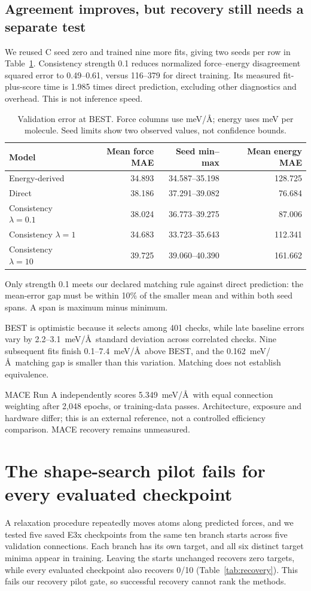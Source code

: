 \documentclass{article}
\begin{document}
\subsection{Agreement improves, but recovery still needs a separate test}
We reused C seed zero and trained nine more fits, giving two seeds per row in Table~\ref{tab:prediction}. Consistency strength 0.1 reduces normalized force--energy disagreement squared error to 0.49--0.61, versus 116--379 for direct training. Its measured fit-plus-score time is 1.985 times direct prediction, excluding other diagnostics and overhead. This is not inference speed.
\begin{table}[H]
\centering\small
\caption{Validation error at BEST. Force columns use meV/\AA; energy uses meV per molecule. Seed limits show two observed values, not confidence bounds.}\label{tab:prediction}
\begin{tabular}{lrrr}\toprule
Model & Mean force MAE & Seed min--max & Mean energy MAE\\\midrule
Energy-derived & 34.893 & 34.587--35.198 & 128.725\\
Direct & 38.186 & 37.291--39.082 & 76.684\\
Consistency $\lambda=0.1$ & 38.024 & 36.773--39.275 & 87.006\\
Consistency $\lambda=1$ & 34.683 & 33.723--35.643 & 112.341\\
Consistency $\lambda=10$ & 39.725 & 39.060--40.390 & 161.662\\\bottomrule
\end{tabular}
\end{table}
Only strength 0.1 meets our declared matching rule against direct prediction: the mean-error gap must be within 10\% of the smaller mean and within both seed spans. A span is maximum minus minimum.

BEST is optimistic because it selects among 401 checks, while late baseline errors vary by 2.2--3.1~meV/\AA\ standard deviation across correlated checks. Nine subsequent fits finish 0.1--7.4~meV/\AA\ above BEST, and the 0.162~meV/\AA\ matching gap is smaller than this variation. Matching does not establish equivalence.

MACE Run A independently scores 5.349~meV/\AA\ with equal connection weighting after 2,048 epochs, or training-data passes. Architecture, exposure and hardware differ; this is an external reference, not a controlled efficiency comparison. MACE recovery remains unmeasured.

\section{The shape-search pilot fails for every evaluated checkpoint}
A relaxation procedure repeatedly moves atoms along predicted forces, and we tested five saved E3x checkpoints from the same ten branch starts across five validation connections. Each branch has its own target, and all six distinct target minima appear in training. Leaving the starts unchanged recovers zero targets, while every evaluated checkpoint also recovers 0/10 (Table~\ref{tab:recovery}). This fails our recovery pilot gate, so successful recovery cannot rank the methods.
\end{document}
